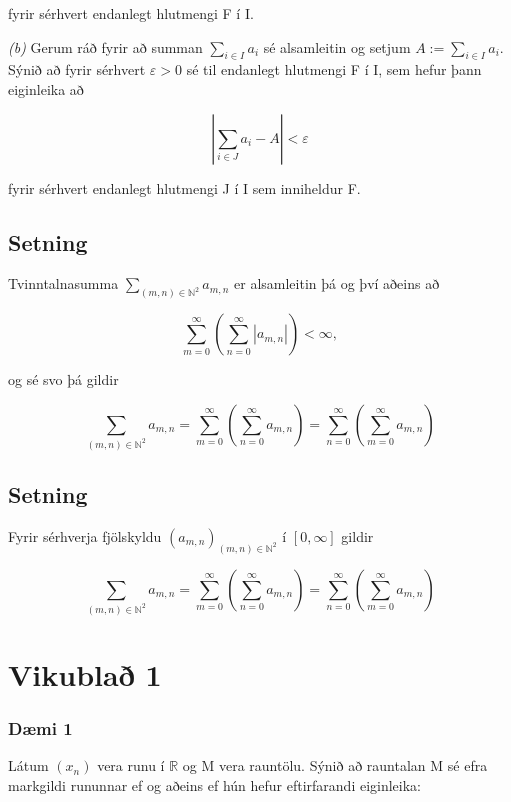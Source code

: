 \documentclass[]{book}
\begin{document}
fyrir sérhvert endanlegt hlutmengi F í I.

\emph{(b)} Gerum ráð fyrir að summan \(\sum_{i\in I}a_i\) sé alsamleitin og setjum \(A:= \sum_{i\in I}a_i\). Sýnið að fyrir sérhvert \(\varepsilon > 0\) sé til endanlegt hlutmengi F í I, sem hefur þann eiginleika að

\[
|\sum_{i\in J}a_i - A| < \varepsilon
\]

fyrir sérhvert endanlegt hlutmengi J í I sem inniheldur F.

\hypertarget{setning-6}{%
\section{Setning}\label{setning-6}}

Tvinntalnasumma \(\sum_{(m,n)\in \mathbb N^2}a_{m,n}\) er alsamleitin þá og því aðeins að

\[
\sum_{m=0}^\infty(\sum_{n=0}^\infty|a_{m,n}|) < \infty,
\]

og sé svo þá gildir

\[
\sum_{(m,n)\in\mathbb N^2} a_{m,n} = \sum_{m=0}^\infty(\sum_{n=0}^\infty a_{m,n})  = \sum_{n=0}^\infty(\sum_{m=0}^\infty a_{m,n})
\]

\hypertarget{setning-7}{%
\section{Setning}\label{setning-7}}

Fyrir sérhverja fjölskyldu \((a_{m,n})_{(m,n)\in \mathbb N^2}\) í \([0, \infty]\) gildir

\[
\sum_{(m,n)\in\mathbb N^2}a_{m,n} = \sum_{m=0}^\infty(\sum_{n=0}^\infty a_{m,n})  = \sum_{n=0}^\infty(\sum_{m=0}^\infty a_{m,n})
\]

\hypertarget{vikubla-1}{%
\chapter*{Vikublað 1}\label{vikubla-1}}

\hypertarget{dmi-1}{%
\subsection*{Dæmi 1}\label{dmi-1}}

Látum \((x_n)\) vera runu í \(\mathbb R\) og M vera rauntölu. Sýnið að rauntalan M sé efra markgildi rununnar ef og aðeins ef hún hefur eftirfarandi eiginleika:
\end{document}
